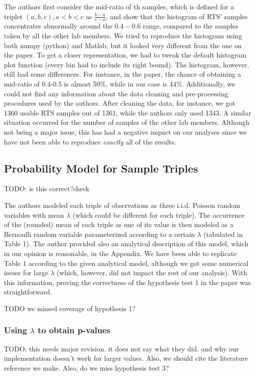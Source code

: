 \documentclass{article}
\begin{document}
The authors first consider the mid-ratio of th samples, which is defined for a triplet \((a, b, c), a<b<c\) as
\(\frac{b-a}{c-a}\), and show that the histogram of RTS' samples concentrates
abnormally around the \(0.4-0.6\) range, compared to the samples taken by all the other lab members. 
We tried to reproduce the histogram using both numpy (python) and Matlab, but it
looked very different from the one on the paper. 
To get a closer representation, we had to tweak the default histogram plot function (every bin had to include its right bound). 
The histogram, however, still had some differences.
For instance, 
in the paper, the chance of obtaining a mid-ratio of
0.4-0.5 is almost 50\%, while in our case is 44\%.
Additionally, we could not find any information about the data cleaning and pre-processing procedures used by the authors.
After cleaning the data, for instance, we got 1360 usable RTS samples out of 1361, while
the authors only used 1343.
A similar situation occurred for the number of samples of the other lab members.
Although not being a major issue, this has had a negative impact on our analyses since we have not been able to reproduce \textit{exactly} all of the results.


    \subsection{Probability Model for Sample Triples}\label{probability-model}
TODO: is this correct?check

The authors modeled each triple of observations as three i.i.d. Poisson random variables with mean $\lambda$ (which could be different for each triple).
The occurrence of the (rounded) mean of each triple as one of its value is then modeled as a Bernoulli random variable parameterized according to a certain $\lambda$ (tabulated in Table 1).
The author provided also an analytical description of this model, which in our opinion is reasonable, in the Appendix.
We have been able to replicate Table 1 according to the given analytical model, although we got some numerical issues for large $\lambda$ (which, however, did not impact the rest of our analysis).
With this information, proving the correctness of the hypothesis test 1 in the paper was straightforward.

TODO we missed coverage of hypothesis 1?
    \subsubsection{Using $\lambda$ to obtain
p-values}\label{using-lambda-to-obtain-p-values}
TODO: this needs major revision.
it does not say what they did. and why our implementation doesn't work for larger values. Also, we should cite the literature reference we make.
Also, do we miss hypothesis test 3?
\end{document}
